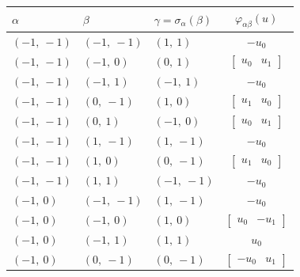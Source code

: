 \documentclass[11pt]{article}
\newcommand{\noi}{\noindent}
\theoremstyle{definition}
\begin{document}
\bigskip

\noi \noindent \begin{longtable}{|l|l|l|c|}
    \hline
    \textbf{$\alpha$} & \textbf{$\beta$} & \textbf{$\gamma = \sigma_{\alpha}(\beta)$} & $\varphi_{\alpha\beta}(u)$ \\
    \hline
    \endhead
    $\left( -1, \  -1\right)$ & $\left( -1, \  -1\right)$ & $\left( 1, \  1\right)$ & $- u_{0}$ \\
    \hline
    $\left( -1, \  -1\right)$ & $\left( -1, \  0\right)$ & $\left( 0, \  1\right)$ & $\left[\begin{matrix}u_{0} & u_{1}\end{matrix}\right]$ \\
    \hline
    $\left( -1, \  -1\right)$ & $\left( -1, \  1\right)$ & $\left( -1, \  1\right)$ & $- u_{0}$ \\
    \hline
    $\left( -1, \  -1\right)$ & $\left( 0, \  -1\right)$ & $\left( 1, \  0\right)$ & $\left[\begin{matrix}u_{1} & u_{0}\end{matrix}\right]$ \\
    \hline
    $\left( -1, \  -1\right)$ & $\left( 0, \  1\right)$ & $\left( -1, \  0\right)$ & $\left[\begin{matrix}u_{0} & u_{1}\end{matrix}\right]$ \\
    \hline
    $\left( -1, \  -1\right)$ & $\left( 1, \  -1\right)$ & $\left( 1, \  -1\right)$ & $- u_{0}$ \\
    \hline
    $\left( -1, \  -1\right)$ & $\left( 1, \  0\right)$ & $\left( 0, \  -1\right)$ & $\left[\begin{matrix}u_{1} & u_{0}\end{matrix}\right]$ \\
    \hline
    $\left( -1, \  -1\right)$ & $\left( 1, \  1\right)$ & $\left( -1, \  -1\right)$ & $- u_{0}$ \\
    \hline
    $\left( -1, \  0\right)$ & $\left( -1, \  -1\right)$ & $\left( 1, \  -1\right)$ & $- u_{0}$ \\
    \hline
    $\left( -1, \  0\right)$ & $\left( -1, \  0\right)$ & $\left( 1, \  0\right)$ & $\left[\begin{matrix}u_{0} & - u_{1}\end{matrix}\right]$ \\
    \hline
    $\left( -1, \  0\right)$ & $\left( -1, \  1\right)$ & $\left( 1, \  1\right)$ & $u_{0}$ \\
    \hline
    $\left( -1, \  0\right)$ & $\left( 0, \  -1\right)$ & $\left( 0, \  -1\right)$ & $\left[\begin{matrix}- u_{0} & u_{1}\end{matrix}\right]$ \\

\end{longtable}
\end{document}
